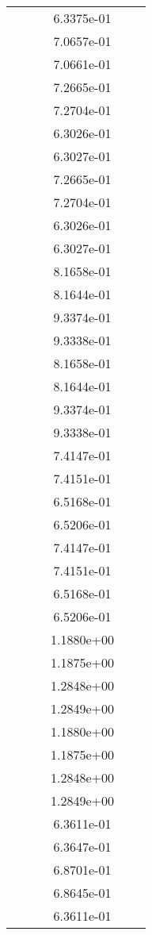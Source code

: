 \begin{xltabular}{\textwidth}{r|rS[table-format=1.3e+2]S[table-format=1.4e+2]S[table-format=1.4e+2]S[table-format=-1.5]}
&  &  & 6.3375e-01 & & \\
&  &  & 7.0657e-01 & & \\
&  &  & 7.0661e-01 & & \\
&  &  & 7.2665e-01 & & \\
&  &  & 7.2704e-01 & & \\
&  &  & 6.3026e-01 & & \\
&  &  & 6.3027e-01 & & \\
&  &  & 7.2665e-01 & & \\
&  &  & 7.2704e-01 & & \\
&  &  & 6.3026e-01 & & \\
&  &  & 6.3027e-01 & & \\
&  &  & 8.1658e-01 & & \\
&  &  & 8.1644e-01 & & \\
&  &  & 9.3374e-01 & & \\
&  &  & 9.3338e-01 & & \\
&  &  & 8.1658e-01 & & \\
&  &  & 8.1644e-01 & & \\
&  &  & 9.3374e-01 & & \\
&  &  & 9.3338e-01 & & \\
&  &  & 7.4147e-01 & & \\
&  &  & 7.4151e-01 & & \\
&  &  & 6.5168e-01 & & \\
&  &  & 6.5206e-01 & & \\
&  &  & 7.4147e-01 & & \\
&  &  & 7.4151e-01 & & \\
&  &  & 6.5168e-01 & & \\
&  &  & 6.5206e-01 & & \\
&  &  & 1.1880e+00 & & \\
&  &  & 1.1875e+00 & & \\
&  &  & 1.2848e+00 & & \\
&  &  & 1.2849e+00 & & \\
&  &  & 1.1880e+00 & & \\
&  &  & 1.1875e+00 & & \\
&  &  & 1.2848e+00 & & \\
&  &  & 1.2849e+00 & & \\
&  &  & 6.3611e-01 & & \\
&  &  & 6.3647e-01 & & \\
&  &  & 6.8701e-01 & & \\
&  &  & 6.8645e-01 & & \\
&  &  & 6.3611e-01 & & \\

\end{xltabular}
